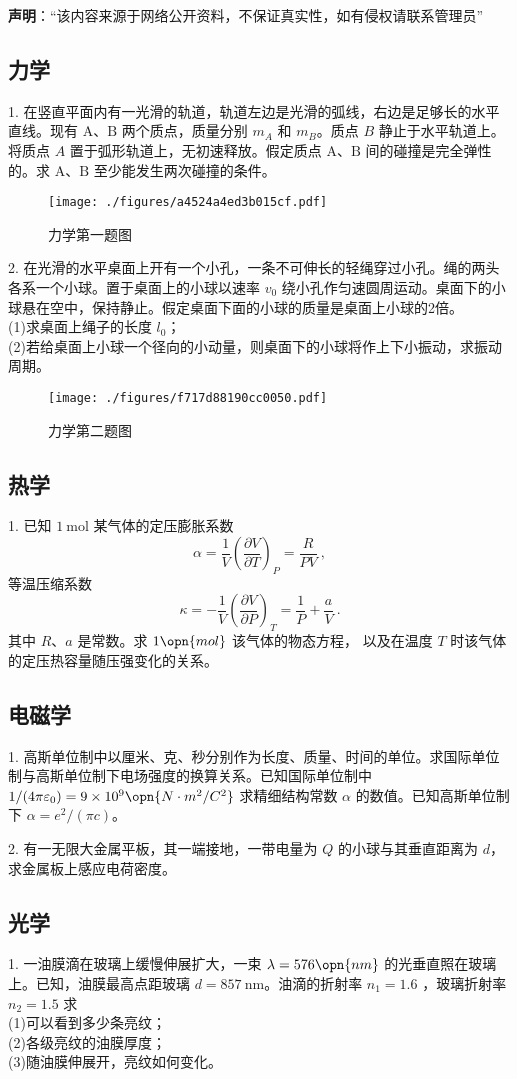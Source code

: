 
\textbf{声明}：“该内容来源于网络公开资料，不保证真实性，如有侵权请联系管理员”

\subsection{力学}
1. 在竖直平面内有一光滑的轨道，轨道左边是光滑的弧线，右边是足够长的水平直线。现有 $\mathrm{A}$、$\mathrm{B}$ 两个质点，质量分别 $m_{A}$ 和 $m_B$。质点 $B$ 静止于水平轨道上。将质点 $A$ 置于弧形轨道上，无初速释放。假定质点 $\mathrm{A}$、$\mathrm{B}$ 间的碰撞是完全弹性的。求 $\mathrm{A}$、$\mathrm{B}$ 至少能发生两次碰撞的条件。
\begin{figure}[ht]
\centering
\texttt{[image: ./figures/a4524a4ed3b015cf.pdf]}
\caption{力学第一题图} \label{fig_NJU18_1}
\end{figure}
2. 在光滑的水平桌面上开有一个小孔，一条不可伸长的轻绳穿过小孔。绳的两头各系一个小球。置于桌面上的小球以速率 $v_{0}$ 绕小孔作匀速圆周运动。桌面下的小球悬在空中，保持静止。假定桌面下面的小球的质量是桌面上小球的2倍。\\
(1)求桌面上绳子的长度 $l_{0}$；\\
(2)若给桌面上小球一个径向的小动量，则桌面下的小球将作上下小振动，求振动周期。
\begin{figure}[ht]
\centering
\texttt{[image: ./figures/f717d88190cc0050.pdf]}
\caption{力学第二题图} \label{fig_NJU18_2}
\end{figure}
\subsection{热学}
1. 已知 $1 \mathrm{~mol}$ 某气体的定压膨胀系数
\begin{equation}
\alpha=\frac{1}{V}\left(\frac{\partial V}{\partial T}\right)_{P}=\frac{R}{P V}~,
\end{equation}
等温压缩系数 
\begin{equation}
\kappa=-\frac{1}{V}\left(\frac{\partial V}{\partial P}\right)_{T}=\frac{1}{P}+\frac{a}{V}~.
\end{equation}
其中 $R$、$a$ 是常数。求 $1\opn{mol}$ 该气体的物态方程， 以及在温度 $T$ 时该气体的定压热容量随压强变化的关系。
\subsection{电磁学}
1. 高斯单位制中以厘米、克、秒分别作为长度、质量、时间的单位。求国际单位制与高斯单位制下电场强度的换算关系。已知国际单位制中 $1/(4 \pi \varepsilon_{0})=9 \times 10^{9} \opn{N \cdot m^{2}/C^{2}}$ 求精细结构常数 $\alpha$ 的数值。已知高斯单位制下 $\alpha=e^{2}/(\pi c)$。

2. 有一无限大金属平板，其一端接地，一带电量为 $Q$ 的小球与其垂直距离为 $d$，求金属板上感应电荷密度。
\subsection{光学}
1. 一油膜滴在玻璃上缓慢伸展扩大，一束 $\lambda=576 \opn{nm}$ 的光垂直照在玻璃上。已知，油膜最高点距玻璃 $d=857 \mathrm{~nm}$。油滴的折射率 $n_{1}=1.6$ ，玻璃折射率 $n_{2}=1.5$ 求\\
(1)可以看到多少条亮纹；\\
(2)各级亮纹的油膜厚度；\\
(3)随油膜伸展开，亮纹如何变化。
